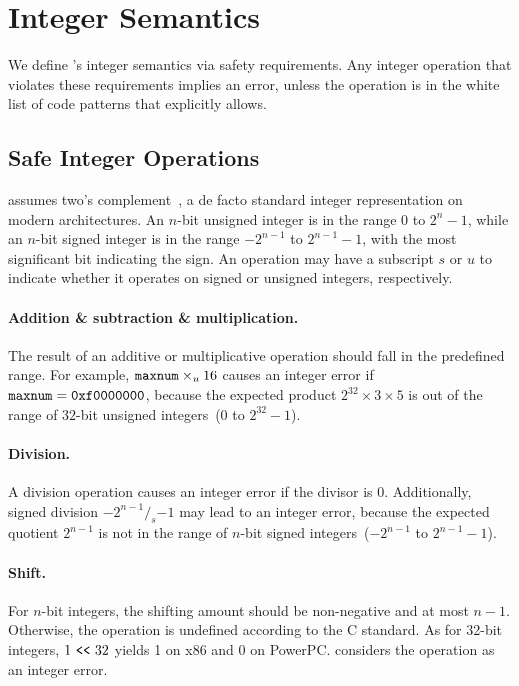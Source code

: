 \section{Integer Semantics}
\label{s:sema}

We define \sys's integer semantics via safety requirements.
Any integer operation that violates these requirements implies
an error, unless the operation is in the white list of code patterns
that \sys explicitly allows.

\subsection{Safe Integer Operations}
\label{s:sema:constr}

\sys assumes two's complement~\cite[\chapterautorefname~4.2.1]{intel:vol1},
a de facto standard integer representation on modern architectures.
An $n$-bit unsigned integer is in the range $0$ to $2^n-1$, while
an $n$-bit signed integer is in the range $-2^{n-1}$ to $2^{n-1}-1$,
with the most significant bit indicating the sign.  An operation
may have a subscript $s$ or $u$ to indicate whether it operates on
signed or unsigned integers, respectively.

\paragraph{Addition \& subtraction \& multiplication.}
The result of an additive or multiplicative operation should fall
in the predefined range.  For example,
$\texttt{maxnum}\times_u 16$ causes an integer error if $\texttt{maxnum} =
\texttt{0xf0000000}$, because the expected product $2^{32}\times
3\times 5$ is out of the range of $32$-bit unsigned integers~($0$
to $2^{32} - 1$).

\paragraph{Division.}
A division operation causes an integer error if the divisor is 0.
Additionally, signed division $-2^{n-1} /_s {-1}$ may lead to an integer
error, because the expected quotient $2^{n-1}$ is not in
the range of $n$-bit signed integers~($-2^{n-1}$ to $2^{n-1}-1$).

\paragraph{Shift.}
For $n$-bit integers, the shifting amount should be non-negative
and at most $n-1$.  Otherwise, the operation is undefined according
to the C standard.  As for 32-bit integers, $1 \ \texttt{<}\texttt{<}\  32$ yields 1
on x86 and 0 on PowerPC.  \sys considers the operation as an integer
error.

